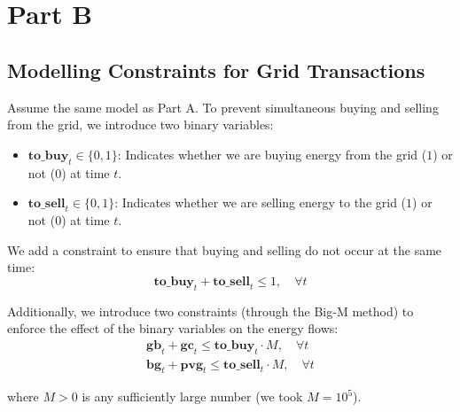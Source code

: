 \documentclass[12pt]{article}
\begin{document}
\pagebreak

\section{Part B}

\subsection{Modelling Constraints for Grid Transactions}
Assume the same model as Part A. To prevent simultaneous buying and selling from the grid, we introduce two binary variables:
\begin{itemize}
    \item \(\mathbf{to\_buy}_t \in \{0, 1\}\): Indicates whether we are buying energy from the grid (\(1\)) or not (\(0\)) at time \(t\).
    \item \(\mathbf{to\_sell}_t \in \{0, 1\}\): Indicates whether we are selling energy to the grid (\(1\)) or not (\(0\)) at time \(t\).
\end{itemize}

We add a constraint to ensure that buying and selling do not occur at the same time:
\begin{equation}
    \mathbf{to\_buy}_t + \mathbf{to\_sell}_t \leq 1, \quad \forall t
\end{equation}

Additionally, we introduce two constraints (through the Big-M method) to enforce the effect of the binary variables on the energy flows:
\begin{align}
    \mathbf{gb}_t + \mathbf{gc}_t \leq \mathbf{to\_buy}_t \cdot M, \quad \forall t \\
    \mathbf{bg}_t + \mathbf{pvg}_t \leq \mathbf{to\_sell}_t \cdot M, \quad \forall t
\end{align}

where \(M > 0\) is any sufficiently large number (we took \(M = 10^5\)).
\end{document}
